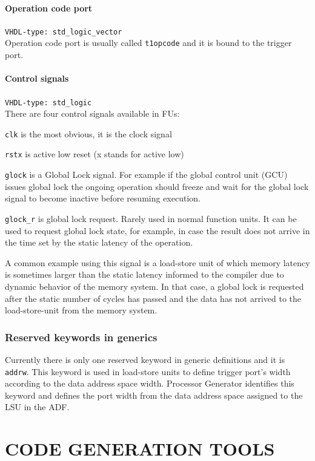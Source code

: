 \documentclass[a4paper,twoside]{tceusermanual}
\begin{document}
\subsubsection{Operation code port}
\verb|VHDL-type: std_logic_vector| \\
Operation code port is usually called \verb|t1opcode| and it is bound to the
trigger port.

\subsubsection{Control signals}
\verb|VHDL-type: std_logic| \\
There are four control signals available in FUs:

\verb|clk| is the most obvious, it is the clock signal

\verb|rstx| is active low reset (x stands for active low)

\verb|glock| is a Global Lock signal. For example if the global control unit
(GCU) issues global lock the ongoing operation should freeze and wait for
the global lock signal to become inactive before resuming execution.

\verb|glock_r| is global lock request. Rarely used in normal function units.
It can be used to request global lock state, for example, in case the
result does not arrive in the time set by the static latency of the
operation. 

A common example using this signal is a load-store unit of which
memory latency is sometimes larger than the static latency informed to the
compiler due to dynamic behavior of the memory system. In that case, a
global lock is requested after the static number of cycles has passed and
the data has not arrived to the load-store-unit from the memory system.

\subsection{Reserved keywords in generics}

Currently there is only one reserved keyword in generic definitions and it is
\verb|addrw|. This keyword is used in load-store units to define trigger
port's width according to the data address space width. Processor Generator
identifies this keyword and defines the port width from the data address space
assigned to the LSU in the ADF.


\chapter{CODE GENERATION TOOLS}
\end{document}
